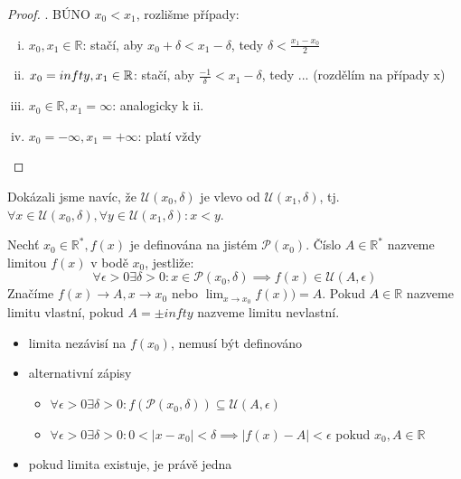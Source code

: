 \begin{proof}.
  BÚNO $x_0<x_1$, rozlišme případy:
  \begin{enumerate}[i.]
    \item $x_0, x_1 \in \mathbb R$: stačí, aby $x_0 + \delta < x_1 - \delta$, tedy $\delta < \frac{x_1 - x_0}{2}$
    \item $x_0 = \-infty, x_1 \in \mathbb R$: stačí, aby $\frac{-1}{\delta} < x_1 - \delta$, tedy ... (rozdělím na případy x)
    \item $x_0 \in \mathbb R, x_1 =  \infty$: analogicky k ii.
    \item $x_0 = - \infty, x_1 = + \infty$: platí vždy
  \end{enumerate}
\end{proof}

\begin{poznamka}
  Dokázali jsme navíc, že $\mathscr U(x_0, \delta)$ je vlevo od $\mathscr U (x_1, \delta)$, tj. $\forall x \in \mathscr U(x_0, \delta), \forall y \in \mathscr U (x_1, \delta): x<y$.
\end{poznamka}

\begin{definice}
  Nechť $x_0 \in \mathbb R^*, f(x)$ je definována na jistém $\mathscr P(x_0)$. Číslo $A \in \mathbb R^*$ nazveme limitou $f(x)$ v bodě $x_0$, jestliže:
  $$\forall \epsilon >0 \exists \delta >0: x \in \mathscr P(x_0, \delta) \implies f(x) \in \mathscr U (A, \epsilon)$$
  Značíme $f(x) \rightarrow A, x \rightarrow x_0$ nebo $\lim_{x \rightarrow x_0}{f(x))}=A$. Pokud $A \in \mathbb R$ nazveme limitu vlastní, pokud $A = \pm infty$ nazveme limitu nevlastní.
\end{definice}

\begin{poznamka}
  \begin{itemize}
    \item limita nezávisí na $f(x_0)$, nemusí být definováno
    \item alternativní zápisy
    \begin{itemize}
      \item $\forall \epsilon > 0 \exists \delta > 0: f(\mathscr P(x_0, \delta)) \subseteq \mathscr U (A, \epsilon)$
      \item $\forall \epsilon > 0 \exists \delta > 0: 0 < |x-x_0| < \delta \implies |f(x) - A| < \epsilon$ pokud $x_0, A \in \mathbb R$
    \end{itemize}
    \item pokud limita existuje, je právě jedna
  \end{itemize}
\end{poznamka}

